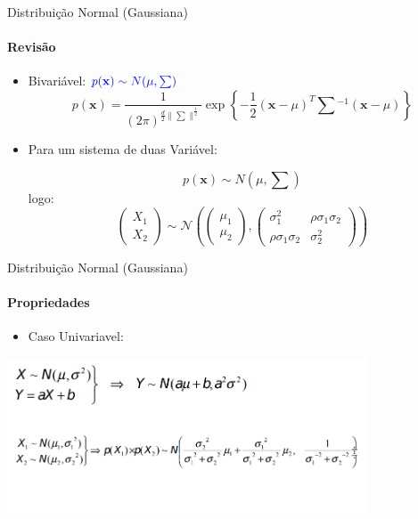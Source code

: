 \documentclass{beamer}
\begin{document}
\begin{frame}{Distribuição Normal (Gaussiana)}
    \framesubtitle{Revisão}
    \begin{itemize}
        \item Bivariável: $\color{blue}{p(\mathbf{x}) \sim N(\mu, \sum)}$
    \begin{equation*}
        p(\mathbf{x}) = \frac{1}{(2\pi)^{\frac{d}{2}\|\sum\|^{\frac{1}{2}}}}\exp\left\{-\frac{1}{2} (\mathbf{x}-\mu)^T\sum{}^{-1}(\mathbf{x}-\mu)\right\}
    \end{equation*}
    
    \item Para um sistema de duas Variável:
    
    \begin{equation*}
        p(\mathbf{x}) \sim N(\mu, \sum)
    \end{equation*}
    logo:     
    \begin{equation*}
        \begin{pmatrix}
            X_1 \\
            X_2
        \end{pmatrix}  \sim \mathcal{N} \left( \begin{pmatrix}
            \mu_1 \\
            \mu_2
        \end{pmatrix} , \begin{pmatrix}
            \sigma^2_1 &  \rho \sigma_1 \sigma_2 \\
            \rho \sigma_1 \sigma_2 &  \sigma^2_2
        \end{pmatrix} \right)
    \end{equation*}
    \end{itemize}
\end{frame}


\begin{frame}{Distribuição Normal (Gaussiana)}
    \framesubtitle{Propriedades}
    \begin{itemize}
        \item Caso Univariavel:
    \end{itemize}
    \centering
    \includegraphics[width=0.8\textwidth]{images/tmp0.png}
\end{frame}
\end{document}
